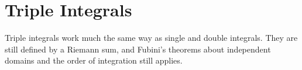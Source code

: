 \section{Triple Integrals}
\noindent
Triple integrals work much the same way as single and double integrals. They are still defined by a Riemann sum, and Fubini's theorems about independent domains and the order of integration still applies.


